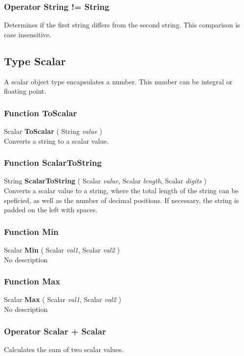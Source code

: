 \documentclass[10pt]{book}
\begin{document}
\subsubsection{Operator String != String \label{O:String!=String}}
Determines if the first string differs from the second string. This comparison is case insensitive.

\subsection{Type Scalar \label{T:Scalar}}
A scalar object type encapsulates a number. This number can be integral or floating point.

\subsubsection{Function ToScalar \label{F:ToScalar}}
Scalar \textbf{ToScalar} ( String \textit{value} ) \\
Converts a string to a scalar value.

\subsubsection{Function ScalarToString \label{F:ScalarToString}}
String \textbf{ScalarToString} ( Scalar \textit{value}, Scalar \textit{length}, Scalar \textit{digits} ) \\
Converts a scalar value to a string, where the total length of the string can be speficied, as well as the number of decimal positions. If necessary, the string is padded on the left with spaces.

\subsubsection{Function Min \label{F:Min}}
Scalar \textbf{Min} ( Scalar \textit{val1}, Scalar \textit{val2} ) \\
No description

\subsubsection{Function Max \label{F:Max}}
Scalar \textbf{Max} ( Scalar \textit{val1}, Scalar \textit{val2} ) \\
No description

\subsubsection{Operator Scalar + Scalar \label{O:Scalar+Scalar}}
Calculates the sum of two scalar values.
\end{document}

